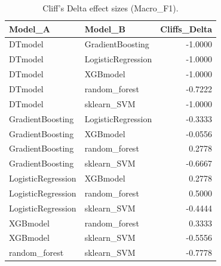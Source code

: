 \begin{table}[t]
\centering
\begin{tabular}{llr}
\toprule
Model_A & Model_B & Cliffs_Delta \\
\midrule
DTmodel & GradientBoosting & -1.0000 \\
DTmodel & LogisticRegression & -1.0000 \\
DTmodel & XGBmodel & -1.0000 \\
DTmodel & random_forest & -0.7222 \\
DTmodel & sklearn_SVM & -1.0000 \\
GradientBoosting & LogisticRegression & -0.3333 \\
GradientBoosting & XGBmodel & -0.0556 \\
GradientBoosting & random_forest & 0.2778 \\
GradientBoosting & sklearn_SVM & -0.6667 \\
LogisticRegression & XGBmodel & 0.2778 \\
LogisticRegression & random_forest & 0.5000 \\
LogisticRegression & sklearn_SVM & -0.4444 \\
XGBmodel & random_forest & 0.3333 \\
XGBmodel & sklearn_SVM & -0.5556 \\
random_forest & sklearn_SVM & -0.7778 \\
\bottomrule
\end{tabular}
\caption{Cliff's Delta effect sizes (Macro_F1).}
\label{tab:cliffs_Macro_F1}
\end{table}
